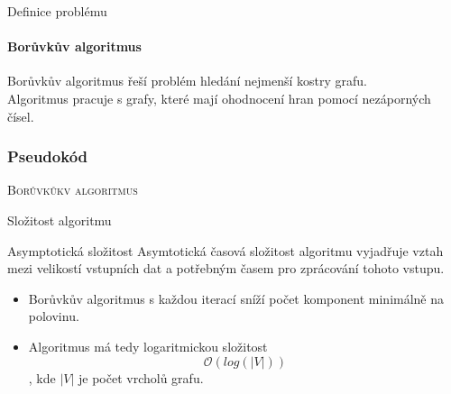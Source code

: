 \documentclass[hyperref={unicode}]{beamer}
\begin{document}
\begin{frame}{Definice problému}
\framesubtitle{Borůvkův algoritmus}
Borůvkův algoritmus řeší problém hledání nejmenší kostry grafu.\\
Algoritmus pracuje s grafy, které mají ohodnocení hran pomocí nezáporných čísel.
\end{frame}
\begin{frame}
\frametitle{Pseudokód}
\textsc{Borůvkůkv algoritmus}
\IncMargin{1.5em}
\begin{algorithm}[H]
{\small
}
\end{algorithm}
\end{frame}
\begin{frame}{Složitost algoritmu}
    \begin{block}{Asymptotická složitost}
    Asymtotická časová složitost algoritmu vyjadřuje vztah mezi velikostí vstupních dat a potřebným časem pro zprácování tohoto vstupu.
    \end{block}
    \begin{itemize}
    \item<2-> Borůvkův algoritmus s každou iterací sníží počet komponent minimálně na polovinu.
    \item<3-> Algoritmus má tedy logaritmickou složitost $$\mathcal{O}(log(|V|))$$, kde $|V|$ je počet vrcholů grafu.
        
    \end{itemize}
\end{frame}
\end{document}
